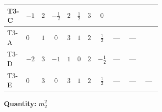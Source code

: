 \documentclass[8pt]{article}
\begin{document}
\begin{landscape}
\begin{longtable}{@{}llcccccc >{\raggedright\arraybackslash}p{0.21\linewidth} >{\raggedright\arraybackslash}p{0.21\linewidth} >{\raggedright\arraybackslash}p{0.21\linewidth}@{}}
\midrule
T3-C & $-1$ & $2$ & $-\frac{1}{2}$ & $2$ & $\frac{1}{2}$ & $3$ & $0$ & \scriptsize\adjustbox{max width=\linewidth}{$\begin{gathered} -\frac{9 {g_2}^2 {m_2^2}}{2}\end{gathered}$} & \scriptsize\adjustbox{max width=\linewidth}{$\begin{gathered} -\frac{3 {g_1}^2 {m_2^2}}{2}\end{gathered}$} & \scriptsize\adjustbox{max width=\linewidth}{$\begin{gathered} +4 {\lambda_{12}^{(1)}} {m_1^2}\end{gathered}$} \\
\midrule
T3-A & $0$ & $1$ & $0$ & $3$ & $1$ & $2$ & $\frac{1}{2}$ & --- & --- & \scriptsize\adjustbox{max width=\linewidth}{$\begin{gathered} +2 {\lambda_{12}^{(1)}} {m_1^2}\end{gathered}$} \\
\midrule
T3-D & $-2$ & $3$ & $-1$ & $1$ & $0$ & $2$ & $-\frac{1}{2}$ & --- & --- & \scriptsize\adjustbox{max width=\linewidth}{$\begin{gathered} +6 {\lambda_{12}^{(1)}} {m_1^2}\end{gathered}$} \\
\midrule
T3-E & $0$ & $3$ & $0$ & $3$ & $1$ & $2$ & $\frac{1}{2}$ & --- & --- & --- \\
\midrule
\bottomrule
\end{longtable}
\clearpage
\noindent\textbf{Quantity: }$m_2^2$\par\smallskip

\end{landscape}
\end{document}
